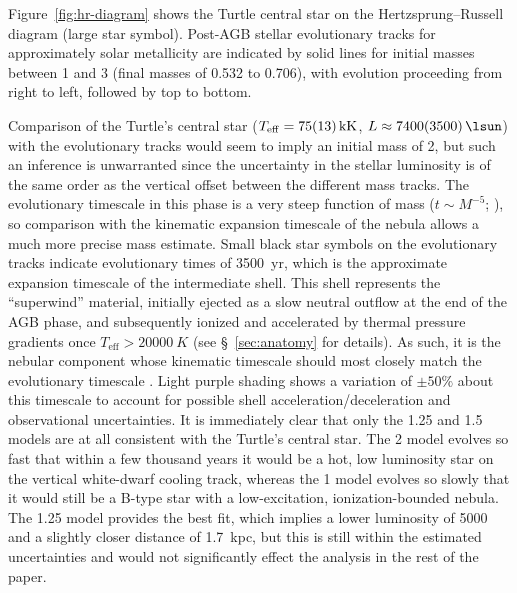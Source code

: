 \documentclass[useAMS, usenatbib]{mnras}
\newcommand{\teff}{\ensuremath{T_\mathrm{eff}}}
\begin{document}
Figure~\ref{fig:hr-diagram} shows the Turtle central star on
the Hertzsprung--Russell diagram (large star symbol).
Post-AGB stellar evolutionary tracks for approximately solar metallicity \citep{Miller-Bertolami:2016a} are indicated by solid lines for initial masses between \SI{1}{\msun} and \SI{3}{\msun}
(final masses of \SI{0.532}{\msun} to \SI{0.706}{\msun}),
with evolution proceeding from right to left, followed by top to bottom.

Comparison of the Turtle's central star
(\(\teff = \SI{75 \pm 13}{kK}\), \(L \approx \SI{7400 \pm 3500}{\lsun}\))
with the evolutionary tracks would seem to imply an initial mass of \SI{2}{\msun},
but such an inference is unwarranted since the uncertainty in the stellar luminosity is of the same order as the vertical offset between the different mass tracks.
The evolutionary timescale in this phase is a very steep function of mass
(\(t \sim M^{-5}\); \citealp[Fig.~4]{Miller-Bertolami:2019a}), so comparison with the kinematic expansion timescale of the nebula allows a much more precise mass estimate.
Small black star symbols on the evolutionary tracks indicate evolutionary times of \SI{3500}{yr}, which is the approximate expansion timescale of the intermediate shell.
This shell represents the ``superwind'' material,
initially ejected as a slow neutral outflow at the end of the AGB phase,
and subsequently ionized and accelerated by thermal pressure gradients
once \(\teff > \SI{20000}{K}\) (see \S~\ref{sec:anatomy} for details).
As such, it is the nebular component whose kinematic timescale should most closely match the evolutionary timescale \citetext{see discussion in \S~2.3.4 of \citealp{Schonberner:2005a}}.
Light purple shading shows a variation of \(\pm 50\%\) about this timescale to account for possible shell acceleration/deceleration and observational uncertainties.
It is immediately clear that only the \num{1.25} and \SI{1.5}{\msun} models are at all consistent with the Turtle's central star.
The \SI{2}{\msun} model evolves so fast that within a few thousand years it would be a hot, low luminosity star on the vertical white-dwarf cooling track,
whereas the \SI{1}{\msun} model evolves so slowly that it would still be a B-type star with a low-excitation, ionization-bounded nebula. 
The \SI{1.25}{\msun} model provides the best fit,
which implies a lower luminosity of \SI{5000}{\lsun}
and a slightly closer distance of \SI{1.7}{kpc},
but this is still within the estimated uncertainties and would not significantly effect the analysis in the rest of the paper.
\end{document}
